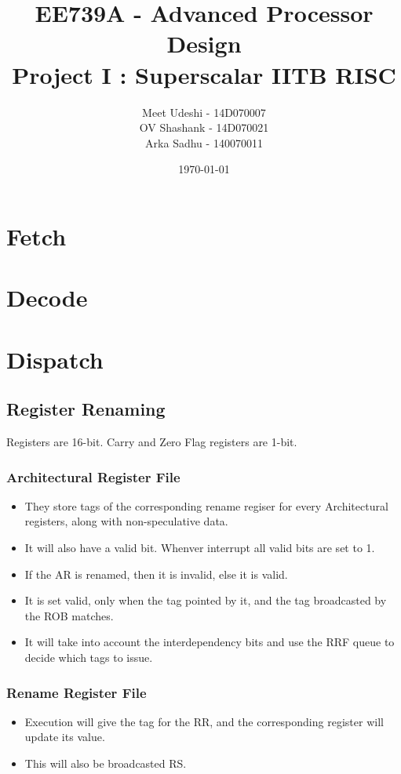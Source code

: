 \documentclass{article}
\title{EE739A - Advanced Processor Design\\
  Project I : Superscalar IITB RISC
}
\author{Meet Udeshi - 14D070007\\
  OV Shashank - 14D070021\\
  Arka Sadhu - 140070011\\
}
\date{\today}
\begin{document}
\maketitle

\section{Fetch}

\section{Decode}

\section{Dispatch}
\subsection{Register Renaming}
Registers are 16-bit.
Carry and Zero Flag registers are 1-bit.
\subsubsection{Architectural Register File}
\begin{itemize}
\item They store tags of the corresponding rename regiser for every Architectural registers, along with non-speculative data.
\item It will also have a valid bit. Whenver interrupt all valid bits are set to 1.
\item If the AR is renamed, then it is invalid, else it is valid.
\item It is set valid, only when the tag pointed by it, and the tag broadcasted by the ROB matches.
\item It will take into account the interdependency bits and use the RRF queue to decide which tags to issue.

\end{itemize}
\subsubsection{Rename Register File}
\begin{itemize}
\item Execution will give the tag for the RR, and the corresponding register will update its value.
\item This will also be broadcasted RS.
\end{itemize}
\end{document}
